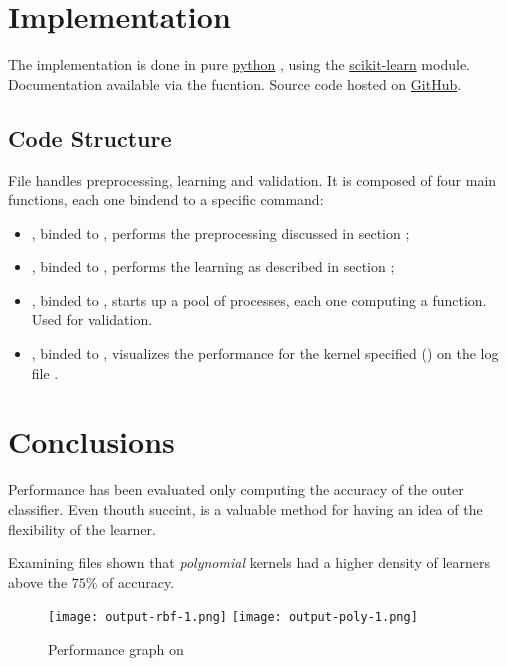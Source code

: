 \documentclass[10pt]{article}
\begin{document}
\section{Implementation}
The implementation is done in pure 
\href{https://python.org/}{python}
, using the \href{http://scikit-learn.org/stable/}{scikit-learn}
module. Documentation available via the  fucntion. 
Source code hosted on \href{https://github.com/mmaker/braindecoding}{GitHub}.

\subsection{Code Structure}
File  handles preprocessing, learning and validation. It is composed of four main functions, each one bindend to a specific command: 
\begin{itemize}
\item {}, binded to , performs the preprocessing discussed in section ;
\item {}, binded to , performs the learning as described in section ;
\item {}, binded to , starts up a pool of processes, each one computing a  function. Used for validation.
\item {}, binded to , visualizes the performance for the kernel specified () on the log file .
\end{itemize}

\section{Conclusions}
Performance has been evaluated only computing the accuracy of the outer classifier. Even thouth succint, is a valuable method for having an idea of the flexibility of the learner.

Examining files  shown that \emph{polynomial} kernels had a higher density of learners above the $75\%$ of accuracy.

\begin{figure}[H]
\texttt{[image: output-rbf-1.png]}
\hfill
\texttt{[image: output-poly-1.png]}
\hfill
\caption{Performance graph on }
\end{figure}
\end{document}
